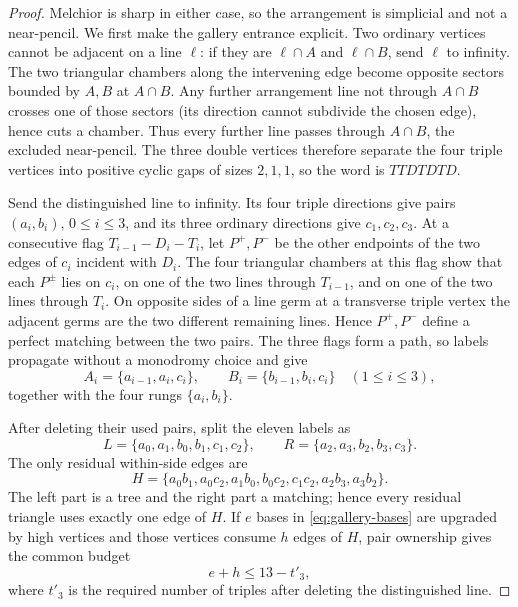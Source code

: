 \begin{proof}
Melchior is sharp in either case, so the arrangement is simplicial and not
a near-pencil.  We first make the gallery entrance explicit.  Two ordinary
vertices cannot be adjacent on a line $\ell$: if they are
$\ell\cap A$ and $\ell\cap B$, send $\ell$ to infinity.  The two triangular
chambers along the intervening edge become opposite sectors bounded by
$A,B$ at $A\cap B$.  Any further arrangement line not through $A\cap B$
crosses one of those sectors (its direction cannot subdivide the chosen
edge), hence cuts a chamber.  Thus every further line passes through
$A\cap B$, the excluded near-pencil.  The three double vertices therefore
separate the four triple vertices into positive cyclic gaps of sizes
$2,1,1$, so the word is $TTDTDTD$.

Send the distinguished line to infinity.  Its four triple directions give
pairs $(a_i,b_i)$, $0\le i\le3$, and its three ordinary directions give
$c_1,c_2,c_3$.  At a consecutive flag
$T_{i-1}-D_i-T_i$, let $P^+,P^-$ be the other endpoints of the two edges of
$c_i$ incident with $D_i$.  The four triangular chambers at this flag show
that each $P^\pm$ lies on $c_i$, on one of the two lines through
$T_{i-1}$, and on one of the two lines through $T_i$.  On opposite sides
of a line germ at a transverse triple vertex the adjacent germs are the two
different remaining lines.  Hence $P^+,P^-$ define a perfect matching
between the two pairs.  The three flags form a path, so labels propagate
without a monodromy choice and give
\begin{equation}
 A_i=\{a_{i-1},a_i,c_i\},\qquad
 B_i=\{b_{i-1},b_i,c_i\}\quad(1\le i\le3),\label{eq:gallery-bases}
\end{equation}
together with the four rungs $\{a_i,b_i\}$.

After deleting their used pairs, split the eleven labels as
\[
 L=\{a_0,a_1,b_0,b_1,c_1,c_2\},\qquad
 R=\{a_2,a_3,b_2,b_3,c_3\}.
\]
The only residual within-side edges are
\begin{equation}\label{eq:gallery-H}
H=\{a_0b_1,a_0c_2,a_1b_0,b_0c_2,c_1c_2,
       a_2b_3,a_3b_2\}.
\end{equation}
The left part is a tree and the right part a matching; hence every residual
triangle uses exactly one edge of $H$.  If $e$ bases in \eqref{eq:gallery-bases}
are upgraded by high vertices and those vertices consume $h$ edges of $H$,
pair ownership gives the common budget
\begin{equation}\label{eq:gallery-budget}
 e+h\le13-t'_3,
\end{equation}
where $t'_3$ is the required number of triples after deleting the
distinguished line.


\end{proof}
